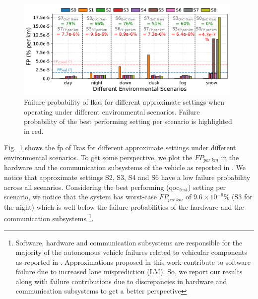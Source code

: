 \begin{figure}[ht]
    \centering
    \includegraphics[width= 0.98\textwidth]{figs/fp.pdf}
    \captionsetup{width=0.9\linewidth}
    \caption{{Failure probability of \gls{lkas} for different approximate settings when operating under different environmental scenarios. Failure probability of the best performing setting per scenario is highlighted in red.}}
    \label{fig:fp}
\end{figure}

Fig.~\ref{fig:fp} shows the \gls{fp} of \gls{lkas} for different approximate settings under different environmental scenarios. To get some perspective, we plot the $FP_{per\ km}$ in the hardware and the communication subsystems of the vehicle as reported in \cite{fault_tree}. We notice that approximate settings S2, S3, S4 and S6 have a low failure probability across all scenarios. Considering the best performing (\gls{qoc}$_{best}$) setting per scenario, we notice that the system has worst-case $FP_{per\ km}$ of $9.6 \times 10^{-6}$\% (S3 for the night) which is well below the failure probabilities of the hardware and the communication subsystems \footnote{Software, hardware and communication subsystems are responsible for the majority of the autonomous vehicle failures related to vehicular components as reported in \cite{fault_tree}. Approximations proposed in this work contribute to software failure due to increased lane misprediction (LM). So, we report our results along with failure contributions due to discrepancies in hardware and communication subsystems to get a better perspective}.

